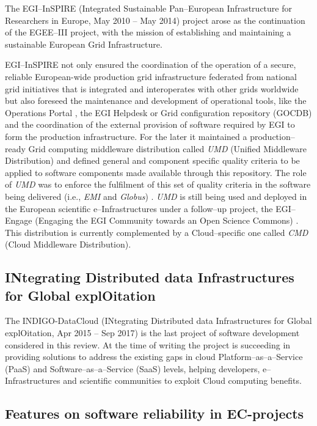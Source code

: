 \documentclass[journal]{IEEEtran}
\begin{document}
The EGI--InSPIRE (Integrated Sustainable Pan--European Infrastructure for
Researchers in Europe, May 2010 -- May 2014) project \cite{cordis:egi-inspire}
arose as the continuation of the EGEE--III project, with the mission of establishing and
maintaining a sustainable European Grid Infrastructure.


EGI--InSPIRE not only ensured the coordination of the operation of a secure, reliable 
European-wide production grid infrastructure federated from national grid initiatives 
that is integrated and interoperates with other grids worldwide but also foreseed the 
maintenance and development of operational tools, like the Operations Portal \cite{egi-ops}, 
the EGI Helpdesk \cite{ggus} or Grid configuration repository (GOCDB) \cite{gocdb} and the 
coordination of the external provision of software required by EGI to 
form the production infrastructure. For the later it maintained a production--ready 
Grid computing middleware distribution called {\sl UMD} (Unified Middleware Distribution) and 
defined general and component specific quality criteria to be applied to software 
components made available through this repository.
The role of {\sl UMD} was to enforce the fulfilment of this set of quality
criteria \cite{egi-qc} in the software being delivered (i.e.,
{\sl EMI} and {\sl Globus}) \cite{mario}. {\sl UMD} is still being used and
deployed in the European scientific e--Infrastructures under a follow--up
project, the EGI--Engage (Engaging the EGI Community towards an Open Science
Commons) \cite{cordis:egi-engage}. This distribution is currently complemented
by a Cloud--specific one called {\sl CMD} (Cloud Middleware Distribution).

\subsection{INtegrating Distributed data Infrastructures for Global
explOitation}

The INDIGO-DataCloud (INtegrating Distributed data Infrastructures for Global
explOitation, Apr 2015 -- Sep 2017) \cite{cordis:indigo} is the last
project of software development considered in this review. At the time of writing
the project is succeeding in providing solutions to address the existing gaps in
cloud Platform--as--a--Service (PaaS) and Software--as--a--Service (SaaS) levels,
helping developers, e--Infrastructures and scientific communities to exploit
Cloud computing benefits.

\subsection{Features on software reliability in EC-projects}
\end{document}
